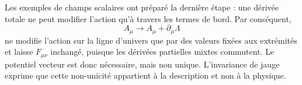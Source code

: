 Les exemples de champs scalaires ont préparé la dernière étape : une dérivée totale ne peut modifier l’action qu’à travers les termes de bord. Par conséquent,
\begin{equation}
A_\mu\longrightarrow A_\mu+\partial_\mu\Lambda
\end{equation}
ne modifie l’action sur la ligne d’univers que par des valeurs fixées aux extrémités et laisse \(F_{\mu\nu}\) inchangé, puisque les dérivées partielles mixtes commutent. Le potentiel vecteur est donc nécessaire, mais non unique. L’invariance de jauge exprime que cette non-unicité appartient à la description et non à la physique.